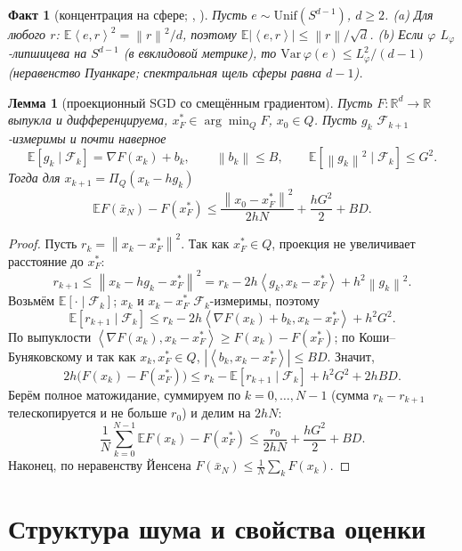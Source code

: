 \documentclass[12pt,a4paper]{article}
\theoremstyle{plain}
\newtheorem{lemma}{Лемма}
\newtheorem{fact}{Факт}
\theoremstyle{definition}
\theoremstyle{remark}
\newcommand{\E}{\mathbb{E}}
\newcommand{\R}{\mathbb{R}}
\newcommand{\norm}[1]{\left\lVert #1\right\rVert}
\newcommand{\abs}[1]{\left\lvert #1\right\rvert}
\newcommand{\ip}[2]{\left\langle #1,#2\right\rangle}
\newcommand{\F}{\mathcal F}
\begin{document}
\begin{fact}[концентрация на сфере; {\cite{ledoux}}, {\cite[лемма~9]{shamir17}}]\label{fact:sphere}
Пусть $e\sim\mathrm{Unif}(S^{d-1})$, $d\ge2$. (a) Для любого $r$: $\E\ip er^2=\norm r^2/d$, поэтому $\E\abs{\ip er}\le\norm r/\sqrt d$. (b) Если $\varphi$ $L_\varphi$-липшицева на $S^{d-1}$ (в евклидовой метрике), то $\mathrm{Var}\,\varphi(e)\le L_\varphi^2/(d-1)$ (неравенство Пуанкаре; спектральная щель сферы равна $d-1$).
\end{fact}

\begin{lemma}[проекционный SGD со смещённым градиентом]\label{lem:sgd}
Пусть $F:\R^d\to\R$ выпукла и дифференцируема, $x^*_F\in\arg\min_QF$, $x_0\in Q$. Пусть $g_k$ $\F_{k+1}$-измеримы и почти наверное
\[
  \E[g_k\mid\F_k]=\nabla F(x_k)+b_k,\qquad\norm{b_k}\le B,\qquad\E[\norm{g_k}^2\mid\F_k]\le G^2 .
\]
Тогда для $x_{k+1}=\Pi_Q(x_k-hg_k)$
\begin{equation}\label{eq:sgd}
  \E F(\bar x_N)-F(x^*_F)\le\frac{\norm{x_0-x^*_F}^2}{2hN}+\frac{hG^2}{2}+BD .
\end{equation}
\end{lemma}
\begin{proof}
Пусть $r_k=\norm{x_k-x^*_F}^2$. Так как $x^*_F\in Q$, проекция не увеличивает расстояние до $x^*_F$:
\[
  r_{k+1}\le\norm{x_k-hg_k-x^*_F}^2=r_k-2h\ip{g_k}{x_k-x^*_F}+h^2\norm{g_k}^2 .
\]
Возьмём $\E[\cdot\mid\F_k]$; $x_k$ и $x_k-x^*_F$ $\F_k$-измеримы, поэтому
\[
  \E[r_{k+1}\mid\F_k]\le r_k-2h\ip{\nabla F(x_k)+b_k}{x_k-x^*_F}+h^2G^2 .
\]
По выпуклости $\ip{\nabla F(x_k)}{x_k-x^*_F}\ge F(x_k)-F(x^*_F)$; по Коши--Буняковскому и так как $x_k,x^*_F\in Q$, $\abs{\ip{b_k}{x_k-x^*_F}}\le BD$. Значит,
\[
  2h\bigl(F(x_k)-F(x^*_F)\bigr)\le r_k-\E[r_{k+1}\mid\F_k]+h^2G^2+2hBD .
\]
Берём полное матожидание, суммируем по $k=0,\dots,N-1$ (сумма $r_k-r_{k+1}$ телескопируется и не больше $r_0$) и делим на $2hN$:
\[
  \frac1N\sum_{k=0}^{N-1}\E F(x_k)-F(x^*_F)\le\frac{r_0}{2hN}+\frac{hG^2}2+BD .
\]
Наконец, по неравенству Йенсена $F(\bar x_N)\le\frac1N\sum_kF(x_k)$.
\end{proof}

\section{Структура шума и свойства оценки}
\end{document}

